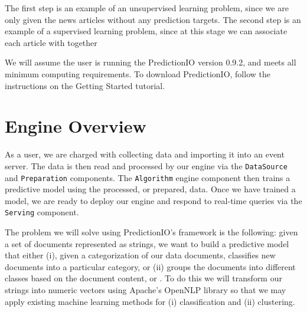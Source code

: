 \documentclass[a4paper,12pt]{article}
\renewcommand{\tt}[1]{\texttt{#1}}
\newcommand{\3}{\left}
\newcommand{\4}{\right}
\renewcommand{\-}[1]{{}^{-#1}}
\begin{document}
The first step is an example of an unsupervised learning problem, since we are only given the news articles without any prediction targets. The second step is an example of a supervised learning problem, since at this stage we can associate each article with  together 

 

We will assume the user is running the PredictionIO version 0.9.2, and meets all minimum computing requirements. To download PredictionIO, follow the instructions on the Getting Started tutorial.

\section*{Engine Overview}

As a user, we are charged with collecting data and importing it into an event server. The data is then read and processed by our engine via the \tt{DataSource} and \tt{Preparation} components. The \tt{Algorithm} engine component then trains a predictive model using the processed, or prepared, data. Once we have trained a model, we are ready to deploy our engine and respond to real-time queries via the \tt{Serving} component. 



The problem we will solve using PredictionIO's framework is the following: given a set of documents represented as strings, we want to build a predictive model that either (i), given a categorization of our data documents, classifies new documents into a particular category, or (ii) groups the documents into different classes based on the document content, or . To do this we will transform our strings into numeric vectors using Apache's OpenNLP library so that we may apply existing machine learning methods for (i) classification and (ii) clustering.
\end{document}
